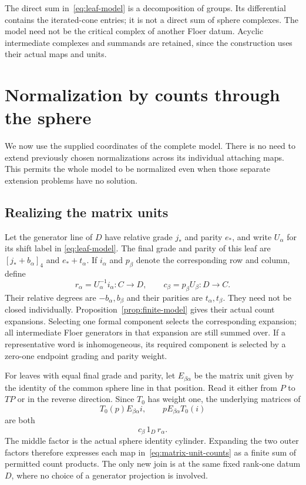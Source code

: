 \documentclass[11pt]{amsart}
\theoremstyle{definition}
\theoremstyle{remark}
\theoremstyle{plain}
\begin{document}
The direct sum in~\eqref{eq:leaf-model} is a decomposition of
groups. Its differential contains the iterated-cone entries;
it is not a direct sum of sphere complexes. The model need not
be the critical complex of another Floer datum. Acyclic
intermediate complexes and summands are retained, since the
construction uses their actual maps and units.

\section{Normalization by counts through the sphere}
\label{sec:normalization}

We now use the supplied coordinates of the complete model.
There is no need to extend previously chosen normalizations
across its individual attaching maps. This permits the whole
model to be normalized even when those separate extension
problems have no solution.

\subsection{Realizing the matrix units}
Let the generator line of $D$ have relative grade $j_*$ and
parity $e_*$, and write $U_\alpha$ for its shift label in
\eqref{eq:leaf-model}. The final grade and parity of this leaf
are $[j_*+b_\alpha]_4$ and $e_*+t_\alpha$. If $i_\alpha$
and $p_\beta$ denote the corresponding row and column, define
\begin{equation}\label{eq:rows-columns}
 r_\alpha=U_\alpha^{-1}i_\alpha:C\longrightarrow D,\qquad
 c_\beta=p_\beta U_\beta:D\longrightarrow C.
\end{equation}
Their relative degrees are $-b_\alpha,b_\beta$ and their parities
are $t_\alpha,t_\beta$. They need not be closed individually.
Proposition~\ref{prop:finite-model} gives their actual count
expansions. Selecting one formal component selects the corresponding
expansion; all intermediate Floer generators in that expansion
are still summed over. If a representative word is inhomogeneous,
its required component is selected by a zero-one endpoint grading
and parity weight.

For leaves with equal final grade and parity, let $E_{\beta\alpha}$
be the matrix unit given by the identity of the common sphere
line in that position. Read it either from $P$ to $TP$ or in
the reverse direction. Since $T_0$ has weight one, the underlying
matrices of
\begin{equation}\label{eq:matrix-unit-counts}
 T_0(p)E_{\beta\alpha}i,\qquad
 pE_{\beta\alpha}T_0(i)
\end{equation}
are both
\begin{equation}\label{eq:sphere-join}
 c_\beta\,1_D\,r_\alpha.
\end{equation}
The middle factor is the actual sphere identity cylinder.
Expanding the two outer factors therefore expresses each map
in~\eqref{eq:matrix-unit-counts} as a finite sum of permitted
count products. The only new join is at the same fixed rank-one
datum $D$, where no choice of a generator projection is involved.
\end{document}
